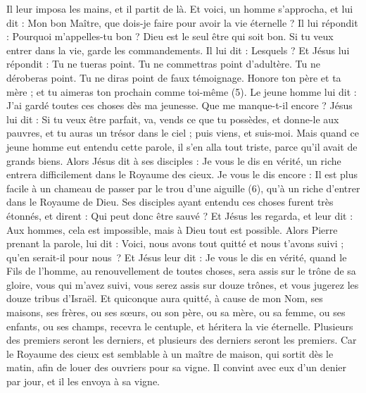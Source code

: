 \begin{multicols}{2}
{Il leur imposa les mains, et il partit de là.
Et voici, un homme s'approcha, et lui dit : Mon bon Maître, que dois-je faire pour avoir la vie éternelle ?
Il lui répondit : Pourquoi m'appelles-tu bon ? Dieu est le seul être qui soit bon. Si tu veux entrer dans la vie, garde les commandements.
Il lui dit : Lesquels ? Et Jésus lui répondit : Tu ne tueras point. Tu ne commettras point d’adultère. Tu ne déroberas point. Tu ne diras point de faux témoignage.
Honore ton père et ta mère ; et tu aimeras ton prochain comme toi-même (5).
Le jeune homme lui dit : J’ai gardé toutes ces choses dès ma jeunesse. Que me manque-t-il encore ?
Jésus lui dit : Si tu veux être parfait, va, vends ce que tu possèdes, et donne-le aux pauvres, et tu auras un trésor dans le ciel ; puis viens, et suis-moi.
Mais quand ce jeune homme eut entendu cette parole, il s'en alla tout triste, parce qu'il avait de grands biens.
Alors Jésus dit à ses disciples : Je vous le dis en vérité, un riche entrera difficilement dans le Royaume des cieux.
Je vous le dis encore : Il est plus facile à un chameau de passer par le trou d'une aiguille (6), qu’à un riche d’entrer dans le Royaume de Dieu.
Ses disciples ayant entendu ces choses furent très étonnés, et dirent : Qui peut donc être sauvé ?
Et Jésus les regarda, et leur dit : Aux hommes, cela est impossible, mais à Dieu tout est possible.
Alors Pierre prenant la parole, lui dit : Voici, nous avons tout quitté et nous t'avons suivi ; qu’en serait-il pour nous ?
Et Jésus leur dit : Je vous le dis en vérité, quand le Fils de l’homme, au renouvellement de toutes choses, sera assis sur le trône de sa gloire, vous qui m’avez suivi, vous serez assis sur douze trônes, et vous jugerez les douze tribus d'Israël.
Et quiconque aura quitté, à cause de mon Nom, ses maisons, ses frères, ou ses sœurs, ou son père, ou sa mère, ou sa femme, ou ses enfants, ou ses champs, recevra le centuple, et héritera la vie éternelle.
Plusieurs des premiers seront les derniers, et plusieurs des derniers seront les premiers.
\VerseOne{}Car le Royaume des cieux est semblable à un maître de maison, qui sortit dès le matin, afin de louer des ouvriers pour sa vigne.
Il convint avec eux d’un denier par jour, et il les envoya à sa vigne.
}
\end{multicols}
